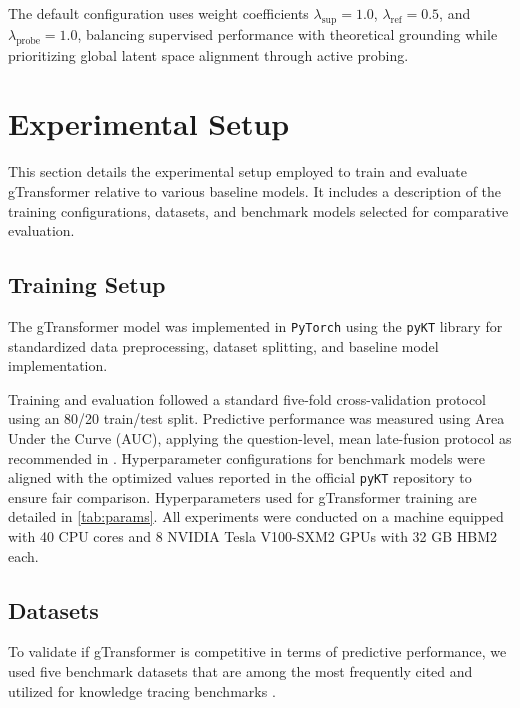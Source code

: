 \documentclass[applsci,article,submit,moreauthors,pdftex]{Definitions/mdpi}
\begin{document}
The default configuration uses weight coefficients $\lambda_{\text{sup}} = 1.0$, $\lambda_{\text{ref}} = 0.5$, and $\lambda_{\text{probe}} = 1.0$, balancing supervised performance with theoretical grounding while prioritizing global latent space alignment through active probing.

\section{Experimental Setup} \label{sec_experiment}

This section details the experimental setup employed to train and evaluate gTransformer relative to various baseline models. It includes a description of the training configurations, datasets, and benchmark models selected for comparative evaluation. 

\subsection{Training Setup}

The gTransformer model was implemented in \texttt{PyTorch} using the \texttt{pyKT} library \citep{liu2022pykt} for standardized data preprocessing, dataset splitting, and baseline model implementation. 

Training and evaluation followed a standard five-fold cross-validation protocol using an 80/20 train/test split. Predictive performance was measured using Area Under the Curve (AUC), applying the question-level, mean late-fusion protocol as recommended in \cite{liu2022pykt}. Hyperparameter configurations for benchmark models were aligned with the optimized values reported in the official \texttt{pyKT} repository to ensure fair comparison. Hyperparameters used for gTransformer training are detailed in \cref{tab:params}. All experiments were conducted on a machine equipped with 40 CPU cores and 8 NVIDIA Tesla V100-SXM2 GPUs with 32 GB HBM2 each.

\subsection{Datasets}\label{sec_dataset}

To validate if gTransformer is competitive in terms of predictive performance, we used five benchmark datasets that are among the most frequently cited and utilized for knowledge tracing benchmarks \citep{liu2022pykt}. 
\end{document}

